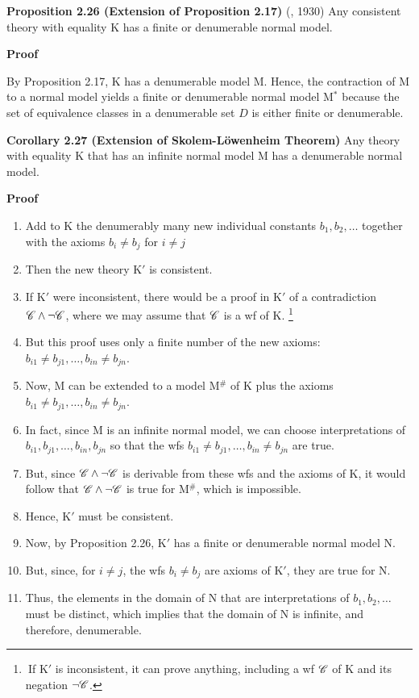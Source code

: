 \textbf{Proposition 2.26 (Extension of Proposition 2.17)}
(\godel, 1930) Any consistent theory with equality K has a finite or denumerable normal model.

\textbf{Proof}

By Proposition 2.17, K has a denumerable model M. Hence, the contraction of M to a normal model yields a finite or denumerable normal model M$^*$ because the set of equivalence classes in a denumerable set $D$ is either finite or denumerable.

\textbf{Corollary 2.27 (Extension of Skolem-L\"owenheim Theorem)}
Any theory with equality K that has an infinite normal model M has a denumerable normal model.

\textbf{Proof}
\begin{enumerate}
    \item Add to K the denumerably many new individual constants $b_1, b_2, \dots$ together with the axioms $b_i \not = b_j$ for $i \not = j$
    \item Then the new theory K$'$ is consistent.
    \item If K$'$ were inconsistent, there would be a proof in K$'$ of a contradiction $\mathscr{C} \land \lnot \mathscr{C}$, where we may assume that $\mathscr{C}$ is a wf of K. \footnote{$\ $If K$'$ is inconsistent, it can prove anything, including a wf $\mathscr{C}$ of K and its negation $\lnot \mathscr{C}$.}
    \item But this proof uses only a finite number of the new axioms: $b_{i1} \not = b_{j1}, \dots, b_{in} \not = b_{jn}$.
    \item Now, M can be extended to a model M$^\#$ of K plus the axioms $b_{i1} \not = b_{j1}, \dots, b_{in} \not = b_{jn}$.
    \item In fact, since M is an infinite normal model, we can choose interpretations of $b_{i1}, b_{j1}, \dots, b_{in}, b_{jn}$ so that the wfs $b_{i1} \not = b_{j1}, \dots, b_{in} \not = b_{jn}$ are true.
    \item But, since $\mathscr{C} \land \lnot \mathscr{C}$ is derivable from these wfs and the axioms of K, it would follow that $\mathscr{C} \land \lnot \mathscr{C}$ is true for M$^\#$, which is impossible.
    \item Hence, K$'$ must be consistent.
    \item Now, by Proposition 2.26, K$'$ has a finite or denumerable normal model N.
    \item But, since, for $i \not = j$, the wfs $b_i \not = b_j$ are axioms of K$'$, they are true for N.
    \item Thus, the elements in the domain of N that are interpretations of $b_1, b_2, \dots$ must be distinct, which implies that the domain of N is infinite, and therefore, denumerable.
\end{enumerate}
